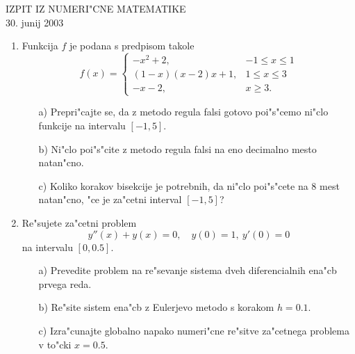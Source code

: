 \documentclass[12pt,a4paper]{article}
\begin{document}
\begin{center}
  IZPIT IZ NUMERI"CNE MATEMATIKE\\
  30. junij 2003
\end{center}
\vspace{1cm}

\begin{enumerate}

  \item Funkcija $f$ je podana s predpisom takole
  $$f(x)=
  \left\{
  \begin{array}{rl}
    -x^2+2, & -1\leq x\leq 1\\
    (1-x)(x-2)x+1,&1\leq x\leq 3\\
    -x-2, & x\geq 3.
  \end{array}
  \right.
  $$  

  \begin{itemize}
    \item[a)] Prepri"cajte se, da z metodo regula falsi gotovo
    poi"s"cemo ni"clo funkcije na intervalu $[-1,5]$.
    \item[b)] Ni"clo poi"s"cite z metodo regula falsi na eno 
    decimalno mesto natan\-"cno.
    \item[c)] Koliko korakov bisekcije je potrebnih, da ni"clo poi"s"cete
    na 8 mest natan"cno, "ce je za"cetni interval $[-1,5]$?
  \end{itemize}
 
  \item Re"sujete za"cetni problem
  $$y''(x)+y(x)=0,\quad y(0)=1,\ y'(0)=0$$
  na intervalu $[0,0.5]$.

    \begin{itemize}
      \item[a)] Prevedite problem na re"sevanje sistema dveh 
      diferencialnih ena"cb prvega reda.

      \item[b)] Re"site sistem ena"cb z Eulerjevo metodo s korakom $h=0.1$.

      \item[c)] Izra"cunajte globalno napako numeri"cne re"sitve za"cetnega 
      problema v to"cki $x=0.5$.

     \end{itemize}
\end{enumerate}
   
\end{document}
